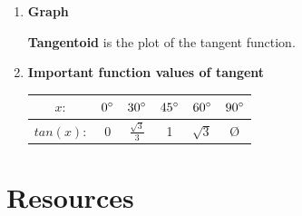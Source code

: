 \documentclass{article}
\begin{document}
\begin{enumerate}
    \item \textbf{Graph}
    
    \textbf{Tangentoid} is the plot of the tangent function.
    
    \item \textbf{Important function values of tangent}
    
    \begin{center}
    \begin{tabular}{||c c c c c c||} 
    \hline
     $x: $ & $0\degree$ & $30\degree$ & $45\degree$ & $60\degree$ & $90\degree$ \\ [0.5ex] 
     \hline
     $tan(x): $ & 0 & $\frac{\sqrt{3}}{3}$ & 1 & $\sqrt{3}$ & $\text{\O}$ \\ [1ex] 
     \hline
    \end{tabular}
    
    \end{center}
    
\end{enumerate}

\section{\textbf{Resources}}
\end{document}
